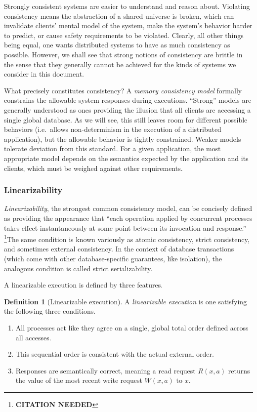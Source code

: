 \documentclass[]             %
{NASA}                       %
\theoremstyle{definition}
\newtheorem{definition}{Definition}[section]
\newcommand{\citationneeded}{\footnote{\textbf{CITATION NEEDED}}}
\providecommand{\tightlist}{%
  \setlength{\itemsep}{0pt}\setlength{\parskip}{0pt}}
\begin{document}
Strongly consistent systems are easier to understand and reason
about. Violating consistency means the abstraction of a shared
universe is broken, which can invalidate clients' mental model of the
system, make the system's behavior harder to predict, or cause safety
requirements to be violated. Clearly, all other things being equal,
one wants distributed systems to have as much consistency as
possible. However, we shall see that strong notions of consistency are
brittle in the sense that they generally cannot be achieved for the
kinds of systems we consider in this document.

What precisely constitutes consistency? A \emph{memory consistency
model} formally constrains the allowable system responses during
executions. ``Strong'' models are generally understood as ones
providing the illusion that all clients are accessing a single global
database. As we will see, this still leaves room for different
possible behaviors (i.e.~allows non-determinism in the execution of a
distributed application), but the allowable behavior is tightly
constrained.  Weaker models tolerate deviation from this standard. For
a given application, the most appropriate model depends on the
semantics expected by the application and its clients, which must be
weighed against other requirements.

\subsubsection{Linearizability}
\label{sssec:linearizability}

\emph{Linearizability}, the strongest common consistency model, can be
concisely defined as providing the appearance that ``each operation
applied by concurrent processes takes effect instantaneously at some
point between its invocation and response.'' \citationneeded The same
condition is known variously as atomic consistency, strict
consistency, and sometimes external consistency. In the context of
database transactions (which come with other database-specific
guarantees, like isolation), the analogous condition is called strict
serializability.

A linearizable execution is defined by three features.

\begin{definition}[Linearizable execution]
  A \emph{linearizable execution} is one satisfying the following three conditions.
\begin{enumerate}
  \tightlist
\item
  All processes act like they agree on a single, global total order
  defined across all accesses.
\item
  This sequential order is consistent with the actual external order.
\item
  Responses are semantically correct, meaning a read request \(R(x, a)\)
  returns the value of the most recent write request \(W(x, a)\) to
  \(x\).
\end{enumerate}
\end{definition}
\end{document}
